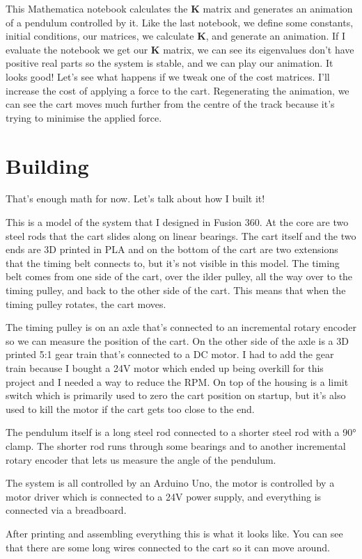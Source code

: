 \documentclass{article}
\renewcommand{\vec}[1]{\boldsymbol{\mathbf{#1}}}
\begin{document}
This Mathematica notebook calculates the $\vec{K}$ matrix and generates an animation of a pendulum controlled by it. Like the last notebook, we define some constants, initial conditions, our matrices, we calculate $\vec{K}$, and generate an animation. If I evaluate the notebook we get our $\vec{K}$ matrix, we can see its eigenvalues don't have positive real parts so the system is stable, and we can play our animation. It looks good! Let's see what happens if we tweak one of the cost matrices. I'll increase the cost of applying a force to the cart. Regenerating the animation, we can see the cart moves much further from the centre of the track because it's trying to minimise the applied force.

\section{Building}

That's enough math for now. Let's talk about how I built it!

This is a model of the system that I designed in Fusion 360. At the core are two steel rods that the cart slides along on linear bearings. The cart itself and the two ends are 3D printed in PLA and on the bottom of the cart are two extensions that the timing belt connects to, but it's not visible in this model. The timing belt comes from one side of the cart, over the ilder pulley, all the way over to the timing pulley, and back to the other side of the cart. This means that when the timing pulley rotates, the cart moves.

The timing pulley is on an axle that's connected to an incremental rotary encoder so we can measure the position of the cart. On the other side of the axle is a 3D printed 5:1 gear train that's connected to a DC motor. I had to add the gear train because I bought a 24V motor which ended up being overkill for this project and I needed a way to reduce the RPM. On top of the housing is a limit switch which is primarily used to zero the cart position on startup, but it's also used to kill the motor if the cart gets too close to the end.

The pendulum itself is a long steel rod connected to a shorter steel rod with a 90° clamp. The shorter rod runs through some bearings and to another incremental rotary encoder that lets us measure the angle of the pendulum.

The system is all controlled by an Arduino Uno, the motor is controlled by a motor driver which is connected to a 24V power supply, and everything is connected via a breadboard.

After printing and assembling everything this is what it looks like. You can see that there are some long wires connected to the cart so it can move around.
\end{document}
